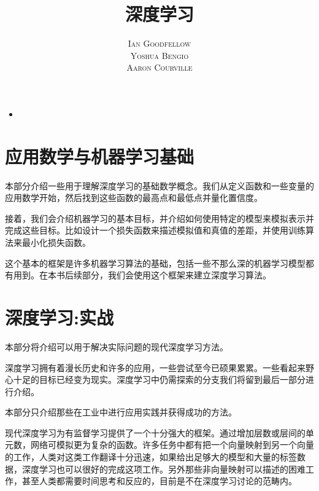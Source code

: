 \documentclass[a4paper,11pt]{book}
\title{\Huge \textbf{深度学习} }
\author{\textsc{Ian Goodfellow} \\ \textsc{Yoshua Bengio} \\ \textsc{Aaron Courville}}
\numberwithin{equation}{chapter}
\begin{document}
\frontmatter
\maketitle
\begin{itemize}
\item 
\end{itemize}

\tableofcontents
\listoffigures
\listoftables

\mainmatter





\part{应用数学与机器学习基础}
\label{part:1}

本部分介绍一些用于理解深度学习的基础数学概念。我们从定义函数和一些变量的应用数学开始，然后找到这些函数的最高点和最低点并量化置信度。


接着，我们会介绍机器学习的基本目标，并介绍如何使用特定的模型来模拟表示并完成这些目标。比如设计一个损失函数来描述模拟值和真值的差距，并使用训练算法来最小化损失函数。


这个基本的框架是许多机器学习算法的基础，包括一些不那么深的机器学习模型都有用到。在本书后续部分，我们会使用这个框架来建立深度学习算法。








\part{深度学习:实战}
\label{part:2}

本部分将介绍可以用于解决实际问题的现代深度学习方法。


深度学习拥有着漫长历史和许多的应用，一些尝试至今已硕果累累。一些看起来野心十足的目标已经变为现实。深度学习中仍需探索的分支我们将留到最后一部分进行介绍。


本部分只介绍那些在工业中进行应用实践并获得成功的方法。


现代深度学习为有监督学习提供了一个十分强大的框架。通过增加层数或层间的单元数，网络可模拟更为复杂的函数。许多任务中都有把一个向量映射到另一个向量的工作，人类对这类工作翻译十分迅速，如果给出足够大的模型和大量的标签数据，深度学习也可以很好的完成这项工作。另外那些非向量映射可以描述的困难工作，甚至人类都需要时间思考和反应的，目前是不在深度学习讨论的范畴内。
\end{document}
